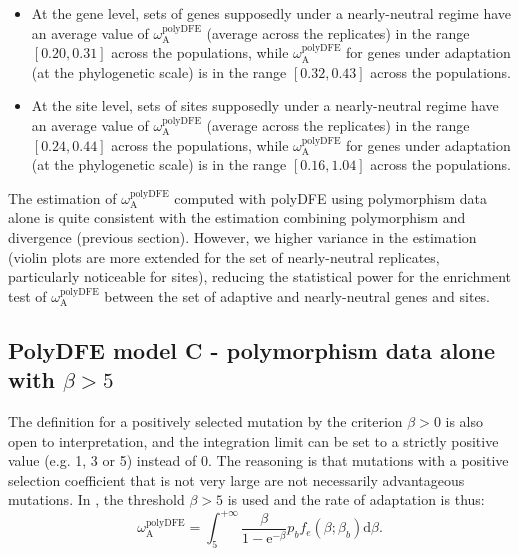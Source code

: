 \documentclass{article}
\newcommand{\der}{\mathrm{d}}
\newcommand{\e}{\mathrm{e}}
\newcommand{\rateApop}{\omega_{\mathrm{A}}}
\newcommand{\Spop}{\beta}
\begin{document}
    \begin{itemize}
        \item At the gene level, sets of genes supposedly under a nearly-neutral regime have an average value of $\rateApop^{\mathrm{polyDFE}}$ (average across the replicates) in the range $[0.20,0.31]$ across the populations, while $\rateApop^{\mathrm{polyDFE}}$ for genes under adaptation (at the phylogenetic scale) is in the range $[0.32,0.43]$ across the populations.
        \item At the site level, sets of sites supposedly under a nearly-neutral regime have an average value of $\rateApop^{\mathrm{polyDFE}}$ (average across the replicates) in the range $[0.24,0.44]$ across the populations, while $\rateApop^{\mathrm{polyDFE}}$ for genes under adaptation (at the phylogenetic scale) is in the range $[0.16,1.04]$ across the populations.
    \end{itemize}

    The estimation of $\rateApop^{\mathrm{polyDFE}}$ computed with polyDFE using polymorphism data alone is quite consistent with the estimation combining polymorphism and divergence (previous section).
    However, we higher variance in the estimation (violin plots are more extended for the set of nearly-neutral replicates, particularly noticeable for sites), reducing the statistical power for the enrichment test of $\rateApop^{\mathrm{polyDFE}}$ between the set of adaptive and nearly-neutral genes and sites.

    \pagebreak

    \subsection{PolyDFE model C - polymorphism data alone with $\Spop > 5$}

    The definition for a positively selected mutation by the criterion $\Spop > 0$ is also open to interpretation, and the integration limit can be set to a strictly positive value (e.g. 1, 3 or 5) instead of 0\cite{galtier_adaptive_2016, tataru_inference_2017}.
    The reasoning is that mutations with a positive selection coefficient that is not very large are not necessarily advantageous mutations.
    In \textcite{galtier_adaptive_2016}, the threshold $\Spop > 5$ is used and the rate of adaptation is thus:
    \begin{equation*}
        \rateApop^{\mathrm{polyDFE}} = \int_{5}^{+\infty} \frac{\Spop}{1 - \e^{-\Spop}} p_b f_{e}(\Spop; \Spop_b) \der \Spop.
    \end{equation*}
    
\end{document}
